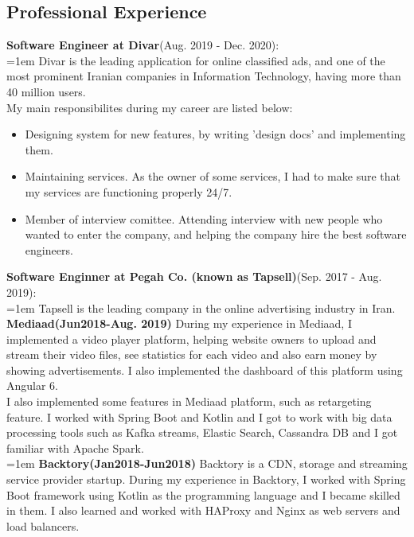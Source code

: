 \documentclass[line, mm]{sampleCV}
\begin{document}
\begin{resume}
\section{\mysidestyle Professional Experience}

\textbf{Software Engineer at Divar}(Aug. 2019 - Dec. 2020): \\
\hangindent=1em
Divar is the leading application for online classified ads, and one of the most prominent Iranian companies in Information Technology, having more than 40 million users. \\ My main responsibilites during my career are listed below:
\begin{itemize}
	\item Designing system for new features, by writing 'design docs' and implementing them.
	\item Maintaining services. As the owner of some services, I had to make sure that my services are functioning properly 24/7. 
	\item Member of interview comittee. Attending interview with new people who wanted to enter the company, and helping the company hire the best software engineers.
\end{itemize}



\textbf{Software Enginner at Pegah Co. (known as Tapsell)}(Sep. 2017 - Aug. 2019): \\
\hangindent=1em
Tapsell is the leading company in the online advertising industry in Iran. \\
\textbf{Mediaad(Jun2018-Aug. 2019)}
During my experience in Mediaad, I implemented a video player platform, helping website owners to upload and stream their video files, see statistics for each video and also earn money by showing advertisements. I also implemented the dashboard of this platform using Angular 6.\\
I also implemented some features in Mediaad platform, such as retargeting feature. 
I worked with Spring Boot and Kotlin and I got to work with big data processing tools such as Kafka streams, Elastic Search, Cassandra DB and I got familiar with Apache Spark.\\
\hangindent=1em
\textbf{Backtory(Jan2018-Jun2018)}
Backtory is a CDN, storage and streaming service provider startup. 
During my experience in Backtory, I worked with Spring Boot framework using Kotlin as the programming language and I became skilled in them. 
I also learned and worked with HAProxy and Nginx as web servers and load balancers.


\end{resume}
\end{document}
